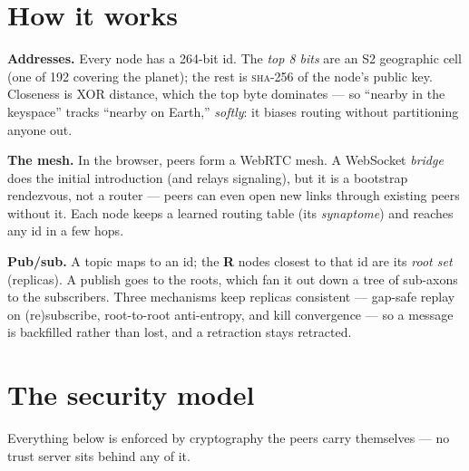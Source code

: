\documentclass[nobib]{tufte-handout}
\begin{document}
\section{How it works}

\textbf{Addresses.} Every node has a 264-bit id. The \emph{top 8 bits} are an S2
geographic cell (one of 192 covering the planet); the rest is
\textsc{sha-256} of the node's public key. Closeness is XOR distance,
which the top byte dominates --- so ``nearby in the keyspace'' tracks ``nearby on
Earth,'' \emph{softly}: it biases routing without partitioning anyone out.

\textbf{The mesh.} In the browser, peers form a WebRTC mesh. A WebSocket
\emph{bridge} does the initial introduction (and relays signaling), but it is a
bootstrap rendezvous, not a router --- peers can even open new links through
existing peers without it. Each node keeps a learned routing table (its
\emph{synaptome}) and reaches any id in a few hops.

\textbf{Pub/sub.} A topic maps to an id; the \textbf{R} nodes closest to that id
are its \emph{root set} (replicas). A publish goes to the roots, which fan it out
down a tree of sub-axons to the subscribers. Three mechanisms keep replicas consistent --- gap-safe
replay on (re)subscribe, root-to-root anti-entropy, and kill convergence --- so a
message is backfilled rather than lost, and a retraction stays retracted.

\section{The security model}

Everything below is enforced by cryptography the peers carry themselves --- no
trust server sits behind any of it.
\end{document}
